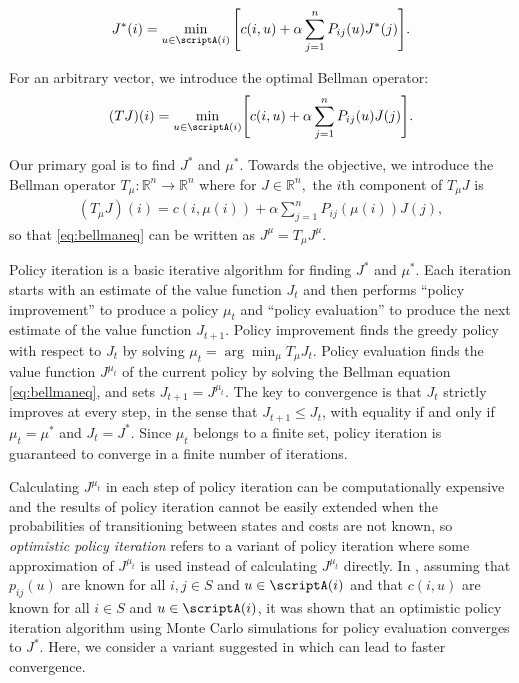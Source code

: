 \documentclass[12pt]{article}
\begin{document}
\begin{equation}
	J^*(i) = \min_{u \in \scriptA(i)} \Bigg[ c(i, u) +  \alpha \sum_{j=1}^n P_{ij}(u) J^*(j) \Bigg ]. \label{Bell}
\end{equation}

For an arbitrary vector, we introduce the optimal Bellman operator:
\begin{equation}
   (T J)(i) = \underset{u \in \scriptA(i)}\min \Bigg[ c(i, u) + \alpha \sum_{j=1}^n P_{ij}(u) J(j)\Bigg] \label{eq:Topt}.
\end{equation}

Our primary goal is to find $J^*$ and $\mu^*$. Towards the objective, we introduce the Bellman operator $T_\mu: \mathbb{R}^n \to \mathbb{R}^n$ where for $J \in \mathbb{R}^n,$ the $i$th component of $T_{\mu}J$ is
\begin{align}
(T_\mu J)(i) = c(i, \mu(i)) + \alpha \sum_{j=1}^n P_{ij}(\mu(i)) J(j), \label{bellmanop} 
\end{align} so that \eqref{eq:bellmaneq} can be written as $J^\mu = T_{\mu} J^{\mu}$.

Policy iteration is a basic iterative algorithm for finding $J^*$ and $\mu^*$. Each iteration starts with an estimate of the value function $J_t$ and then performs ``policy improvement'' to produce a policy $\mu_t$ and ``policy evaluation'' to produce the next estimate of the value function $J_{t+1}$. Policy improvement finds the greedy policy with respect to $J_t$ by solving $\mu_{t} = \arg\min_{\mu} T_{\mu} J_t$. Policy evaluation finds the value function $J^{\mu_t}$ of the current policy by solving the Bellman equation \eqref{eq:bellmaneq}, and sets $J_{t+1} = J^{\mu_t}$. The key to convergence is that $J_t$ strictly improves at every step, in the sense that $J_{t+1} \leq J_t$, with equality if and only if $\mu_t = \mu^*$ and $J_t = J^*$. Since $\mu_t$ belongs to a finite set, policy iteration is guaranteed to converge in a finite number of iterations.

Calculating $J^{\mu_t}$ in each step of policy iteration can be computationally expensive and the results of policy iteration cannot be easily extended when the probabilities of transitioning between states and costs are not known, so \emph{optimistic policy iteration} refers to a variant of policy iteration where some approximation of $J^{\mu_t}$ is used instead of calculating $J^{\mu_t}$ directly. In \cite{tsitsiklis2002convergence}, assuming that $p_{ij}(u)$ are known for all $i, j \in S$ and $u \in \scriptA(i)$ and that $c(i, u)$ are known for all $i \in S$ and $u \in \scriptA(i)$, it was shown that an optimistic policy iteration algorithm using Monte Carlo simulations for policy evaluation converges to $J^*$. Here, we consider a variant suggested in \cite{tsitsiklis2002convergence} which can lead to faster convergence. 
\end{document}
